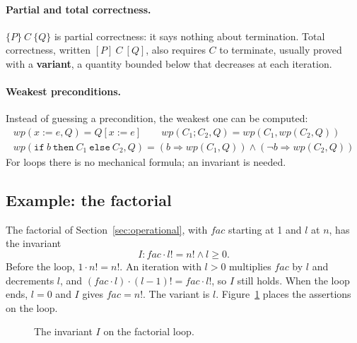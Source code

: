 \paragraph{Partial and total correctness.} $\{P\}\ C\ \{Q\}$ is partial
correctness: it says nothing about termination. Total correctness, written
$[P]\ C\ [Q]$, also requires $C$ to terminate, usually proved with a
\textbf{variant}, a quantity bounded below that decreases at each iteration.

\paragraph{Weakest preconditions.} Instead of guessing a precondition, the
weakest one can be computed:
\[
\begin{array}{l}
\mathit{wp}(x := e, Q) = Q[x := e] \qquad
\mathit{wp}(C_1 ; C_2, Q) = \mathit{wp}(C_1, \mathit{wp}(C_2, Q)) \\
\mathit{wp}(\mathtt{if}\ b\ \mathtt{then}\ C_1\ \mathtt{else}\ C_2, Q) = (b \Rightarrow \mathit{wp}(C_1, Q)) \wedge (\neg b \Rightarrow \mathit{wp}(C_2, Q))
\end{array}
\]
For loops there is no mechanical formula; an invariant is needed.

\subsection{Example: the factorial}

The factorial of Section~\ref{sec:operational}, with $\mathit{fac}$ starting at 1
and $l$ at $n$, has the invariant
\[
I : \mathit{fac} \cdot l! = n! \wedge l \ge 0.
\]
Before the loop, $1 \cdot n! = n!$. An iteration with $l > 0$ multiplies
$\mathit{fac}$ by $l$ and decrements $l$, and
$(\mathit{fac} \cdot l) \cdot (l - 1)! = \mathit{fac} \cdot l!$, so $I$ still holds. When
the loop ends, $l = 0$ and $I$ gives $\mathit{fac} = n!$. The variant is $l$.
Figure~\ref{fig:invariant} places the assertions on the loop.

\begin{figure}[h]
\centering
{}
\caption{The invariant $I$ on the factorial loop.}
\label{fig:invariant}
\end{figure}

